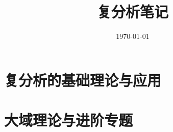 \documentclass[UTF8,12pt,a4paper,fontset=fandol]{ctexbook}
\title{复分析笔记}
\author{}
\date{\today}
\begin{document}
\frontmatter %


\maketitle
\tableofcontents
\clearpage

\mainmatter


\part{复分析的基础理论与应用}












\part{大域理论与进阶专题}





\appendix




\end{document}

